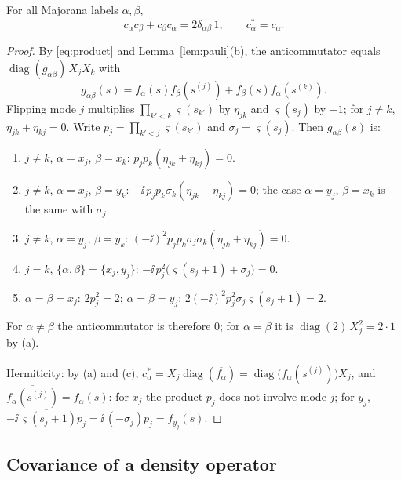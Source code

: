 \begin{theorem}\label{thm:car}
For all Majorana labels $\alpha,\beta$,
\[
 c_\alpha c_\beta+c_\beta c_\alpha=2\delta_{\alpha\beta}\,1,\qquad c_\alpha^*=c_\alpha .
\]
\end{theorem}
\begin{proof}
By \eqref{eq:product} and Lemma~\ref{lem:pauli}(b), the anticommutator equals
$\operatorname{diag}(g_{\alpha\beta})\,X_jX_k$ with
\[
 g_{\alpha\beta}(s)=f_\alpha(s)f_\beta(s^{(j)})+f_\beta(s)f_\alpha(s^{(k)}) .
\]
Flipping mode $j$ multiplies $\prod_{k'<k}\varsigma(s_{k'})$ by $\eta_{jk}$ and
$\varsigma(s_j)$ by $-1$; for $j\neq k$, $\eta_{jk}+\eta_{kj}=0$. Write
$p_j=\prod_{k'<j}\varsigma(s_{k'})$ and $\sigma_j=\varsigma(s_j)$. Then $g_{\alpha\beta}(s)$ is:
\begin{enumerate}
\item[(i)] $j\neq k$, $\alpha=x_j$, $\beta=x_k$: $p_jp_k(\eta_{jk}+\eta_{kj})=0$.
\item[(ii)] $j\neq k$, $\alpha=x_j$, $\beta=y_k$: $-\ii\,p_jp_k\sigma_k(\eta_{jk}+\eta_{kj})=0$;
 the case $\alpha=y_j$, $\beta=x_k$ is the same with $\sigma_j$.
\item[(iii)] $j\neq k$, $\alpha=y_j$, $\beta=y_k$: $(-\ii)^2p_jp_k\sigma_j\sigma_k(\eta_{jk}+\eta_{kj})=0$.
\item[(iv)] $j=k$, $\{\alpha,\beta\}=\{x_j,y_j\}$: $-\ii\,p_j^2\bigl(\varsigma(s_j+1)+\sigma_j\bigr)=0$.
\item[(v)] $\alpha=\beta=x_j$: $2p_j^2=2$; $\alpha=\beta=y_j$:
 $2(-\ii)^2p_j^2\sigma_j\varsigma(s_j+1)=2$.
\end{enumerate}
For $\alpha\neq\beta$ the anticommutator is therefore $0$; for $\alpha=\beta$ it is
$\operatorname{diag}(2)\,X_j^2=2\cdot1$ by (a).

Hermiticity: by (a) and (c),
$c_\alpha^*=X_j\operatorname{diag}(\overline{f_\alpha})
=\operatorname{diag}\bigl(\overline{f_\alpha(s^{(j)})}\bigr)X_j$, and
$\overline{f_\alpha(s^{(j)})}=f_\alpha(s)$: for $x_j$ the product $p_j$ does not involve
mode $j$; for $y_j$,
$\overline{-\ii\,\varsigma(s_j+1)p_j}=\ii\,(-\sigma_j)p_j=f_{y_j}(s)$.
\end{proof}

\subsection{Covariance of a density operator}

